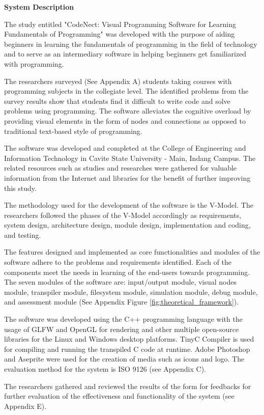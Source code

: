 \flushleft
\textbf{System Description}
\justifying

\parx
The study entitled "CodeNect: Visual Programming Software for Learning
Fundamentals of Programming" was developed with the purpose of aiding beginners
in learning the fundamentals of programming in the field of technology and to serve
as an intermediary software in helping beginners get familiarized with programming.

\parx
The researchers surveyed (See Appendix A) students taking
courses with programming subjects in the collegiate level. The identified
problems from the survey results show that students find it difficult to write
code and solve problems using programming. The software alleviates the
cognitive overload by providing visual elements in the form of nodes and
connections as opposed to traditional text-based style of programming.

\parx
The software was developed and completed at the College of Engineering and
Information Technology in Cavite State University - Main, Indang Campus. The
related resources such as studies and researches were gathered for valuable
information from the Internet and libraries for the benefit of further improving
this study.

\parx
The methodology used for the development of the software is the V-Model. The
researchers followed the phases of the V-Model accordingly as requirements,
system design, architecture design, module design, implementation and coding,
and testing.

\parx
The features designed and implemented as core functionalities and modules of the
software adhere to the problems and requirements identified. Each of the components
meet the needs in learning of the end-users towards programming. The seven modules
of the software are: input/output module, visual nodes module, transpiler module,
filesystem module, simulation module, debug module, and assessment module
(See Appendix Figure \ref{fig:theoretical_framework}).

\parx
The software was developed using the C++ programming language with the usage of
GLFW and OpenGL for rendering and other multiple open-source libraries for the
Linux and Windows desktop platforms. TinyC Compiler is used for compiling and
running the transpiled C code at runtime. Adobe Photoshop and Aseprite were
used for the creation of media such as icons and logo. The evaluation method
for the system is ISO 9126 (see Appendix C).

\parx
The researchers gathered and reviewed the results of the form for feedbacks for
further evaluation of the effectiveness and functionality of the system (see Appendix E).
